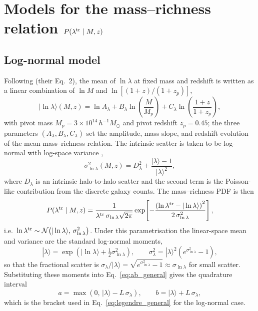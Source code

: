 \documentclass[a4paper, 11pt]{article}
\newcommand{\ltr}{\lambda^{\rm tr}}
\begin{document}
\section{Models for the mass--richness relation $P(\ltr\mid M,z)$}

\subsection{Log-normal model}

Following \citet{Costanzi2021} (their Eq.~2), the mean of $\ln\lambda$ at fixed mass and redshift is written as a linear combination of $\ln M$ and $\ln[(1+z)/(1+z_p)]$,
\begin{equation}
|\ln\lambda\rangle(M,z)
=
\ln A_\lambda
+ B_\lambda \ln\!\left(\frac{M}{M_p}\right)
+ C_\lambda \ln\!\left(\frac{1+z}{1+z_p}\right),
\label{eq:mean_relation}
\end{equation}
with pivot mass $M_p = 3\times 10^{14}\,h^{-1}M_\odot$ and pivot redshift $z_p=0.45$; the three parameters $(A_\lambda, B_\lambda, C_\lambda)$ set the amplitude, mass slope, and redshift evolution of the mean mass--richness relation. The intrinsic scatter is taken to be log-normal with log-space variance \citep[also following][]{Costanzi2021},
\begin{equation}
\sigma^2_{\ln\lambda}(M,z)
= D_\lambda^{2}
+ \frac{|\lambda\rangle - 1}{|\lambda\rangle^{2}},
\label{eq:sigma_lnlambda}
\end{equation}
where $D_\lambda$ is an intrinsic halo-to-halo scatter and the second term is the Poisson-like contribution from the discrete galaxy counts. The mass--richness PDF is then
\begin{equation}
P(\ltr\mid M,z)
=
\frac{1}{\ltr\,\sigma_{\ln\lambda}\sqrt{2\pi}}
\exp\!\left[
-\frac{\left(\ln\ltr-|\ln\lambda\rangle\right)^{2}}{2\,\sigma^2_{\ln\lambda}}
\right],
\label{eq:lognormal_mor}
\end{equation}
i.e.\ $\ln\ltr\sim\mathcal N\!\left(|\ln\lambda\rangle,\,\sigma^{2}_{\ln\lambda}\right)$. Under this parametrisation the linear-space mean and variance are the standard log-normal moments,
\begin{equation}
|\lambda\rangle
= \exp\!\left(|\ln\lambda\rangle+\tfrac{1}{2}\sigma^{2}_{\ln\lambda}\right),
\qquad
\sigma_{\lambda}^{2}
= |\lambda\rangle^{2}\left(e^{\sigma^{2}_{\ln\lambda}}-1\right),
\label{eq:lognormal_moments}
\end{equation}
so that the fractional scatter is $\sigma_{\lambda}/|\lambda\rangle = \sqrt{e^{\sigma^{2}_{\ln\lambda}}-1}\approx\sigma_{\ln\lambda}$ for small scatter. Substituting these moments into Eq.~\eqref{eq:ab_general} gives the quadrature interval
\begin{equation}
a=\max\!\left(0,\,|\lambda\rangle - L\,\sigma_{\lambda}\right),
\qquad
b=|\lambda\rangle + L\,\sigma_{\lambda},
\label{eq:ab_lognormal}
\end{equation}
which is the bracket used in Eq.~\eqref{eq:legendre_general} for the log-normal case.
\end{document}

